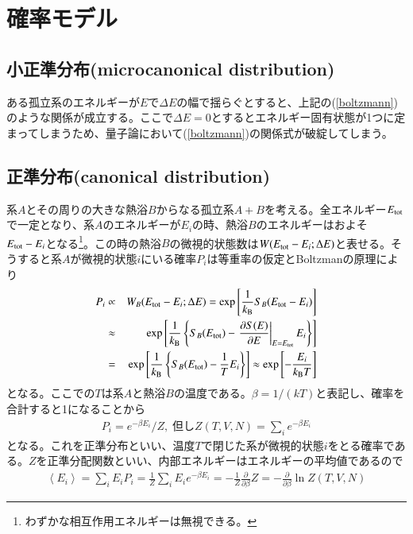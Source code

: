 \documentclass[a4paper,12pt, oneside, openany]{jsbook}
\begin{document}
\section{確率モデル}
\subsection{小正準分布(microcanonical distribution)}
ある孤立系のエネルギーが$E$で$\Delta E$の幅で揺らぐとすると、上記の(\ref{boltzmann})のような関係が成立する。ここで$\Delta E=0$とするとエネルギー固有状態が1つに定まってしまうため、量子論において(\ref{boltzmann})の関係式が破綻してしまう。

\subsection{正準分布(canonical distribution)}
系$A$とその周りの大きな熱浴$B$からなる孤立系$A+B$を考える。全エネルギー$E_{\rm{tot}}$で一定となり、系$A$のエネルギーが$E_i$の時、熱浴$B$のエネルギーはおよそ$E_{\rm{tot}}-E_i$となる\footnote{わずかな相互作用エネルギーは無視できる。}。この時の熱浴$B$の微視的状態数は$W(E_{\rm{tot}}-E_i;\Delta E)$と表せる。そうすると系$A$が微視的状態$i$にいる確率$P_i$は等重率の仮定とBoltzmanの原理により
\begin{eqnarray}
  \begin{split}
    P_i&\propto& W_B(E_{\rm{tot}}-E_i;\Delta E) = \exp\left[\frac{1}{k_{\text{B}}}S_B(E_{\rm{tot}}-E_i)\right] \\
  &\approx & \exp\left[\frac{1}{k_{\text{B}}} \left\{S_B(E_{\rm{tot}})-\left.\frac{\partial S(E)}{\partial E
  }\right|_{E=E_{\rm{tot}}}   E_i\right\} \right] \\
  &=&\exp\left[\frac{1}{k_{\text{B}}} \left\{S_B(E_{\rm{tot}})-\frac{1}{T} E_i\right\} \right]\approx \exp\left[-\frac{E_i}{k_{\text{B}}T} \right]
  \end{split}
\end{eqnarray}
となる。ここでの$T$は系$A$と熱浴$B$の温度である。$\beta=1/(kT)$と表記し、確率を合計すると1になることから
\begin{eqnarray}
  P_i = e^{-\beta E_i}/Z ,\;但しZ(T,V,N)=\sum_{i}  e^{-\beta E_i}
\end{eqnarray}
となる。これを正準分布といい、温度$T$で閉じた系が微視的状態$i$をとる確率である。$Z$を正準分配関数といい、内部エネルギーはエネルギーの平均値であるので
\begin{eqnarray}
  \left\langle E_i\right\rangle  =\sum _i E_i P_i=\frac{1}{Z} \sum_i E_i e^{-\beta E_i}=-\frac{1}{Z} \frac{\partial}{\partial \beta}Z =-\frac{\partial}{\partial \beta} \ln Z(T,V,N)
\end{eqnarray}
\end{document}
